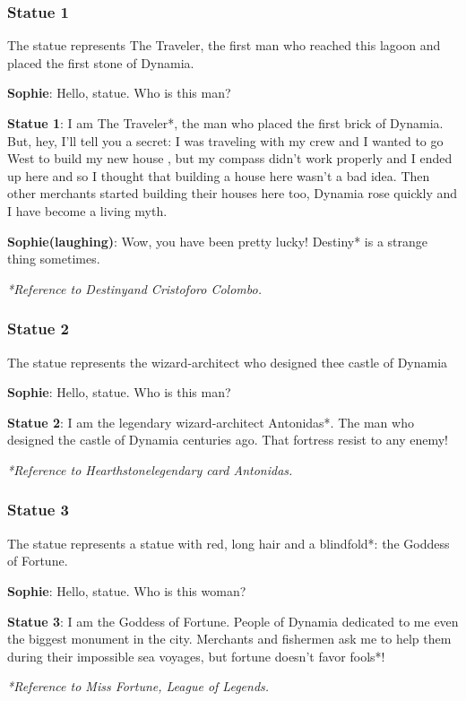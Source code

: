 \subsubsection*{Statue 1}
The statue represents The Traveler, the first man who reached this lagoon and placed the first stone of Dynamia.

\textbf{Sophie}: Hello, statue. Who is this man?

\textbf{Statue 1}: I am The Traveler*, the man who placed the first brick of Dynamia. But, hey, I'll tell you a secret: I was traveling with my crew and I wanted to go West to build my new house , but my compass didn't work properly and I ended up here and so I thought that building a house here wasn't a bad idea. Then other merchants started building their houses here too, Dynamia rose quickly and I have become a living myth.

\textbf{Sophie(laughing)}: Wow, you have been pretty lucky! Destiny* is a strange thing sometimes.

\textit{*Reference to Destiny\texttrademark and Cristoforo Colombo.}

\subsubsection*{Statue 2}
The statue represents the wizard-architect who designed thee castle of Dynamia

\textbf{Sophie}: Hello, statue. Who is this man?

\textbf{Statue 2}: I am the legendary wizard-architect Antonidas*. The man who designed the castle of Dynamia centuries ago. That fortress resist to any enemy!


\textit{*Reference to Hearthstone\texttrademark legendary card Antonidas.}

\subsubsection*{Statue 3}
The statue represents a statue with red, long hair and a blindfold*: the Goddess of Fortune.

\textbf{Sophie}: Hello, statue. Who is this woman?

\textbf{Statue 3}: I am the Goddess of Fortune. People of Dynamia dedicated to me even the biggest monument in the city. Merchants and fishermen ask me to help them during their impossible sea voyages, but fortune doesn't favor fools*!

\textit{*Reference to Miss Fortune, League of Legends\texttrademark{}.}

